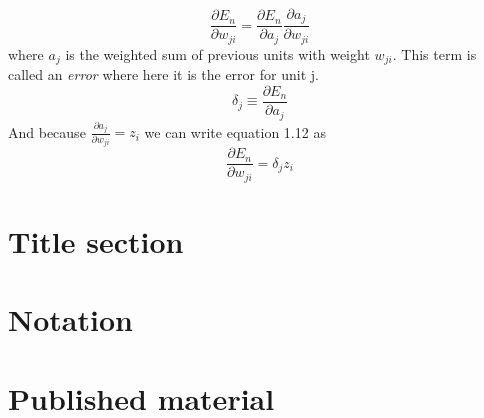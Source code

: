 \begin{equation}
        \frac{\partial E_n}{\partial w_{ji}} =  \frac{\partial E_n}{\partial a_j} \frac{\partial a_j}{\partial w_{ji}}
\end{equation} where $a_j$ is the weighted sum of previous units with weight $w_{ji}$. This term is called an \textit{error} where here it is the error for unit j.
\begin{equation}
    \delta_{j} \equiv \frac{\partial E_n}{\partial a_j} 
\end{equation}
And because $\frac{\partial a_j}{\partial w_{ji}} = z_{i}$ we can write equation 1.12 as
\begin{equation}
    \frac{\partial E_n}{\partial w_{ji}} =  \delta_{j} z_{i}
\end{equation}












\section{Title section}
\section{Notation}
\section{Published material}



